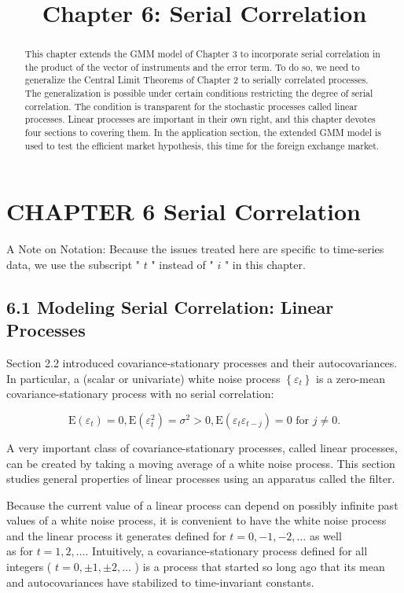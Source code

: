 \documentclass[10pt]{article}
\title{Chapter 6: Serial Correlation}
\author{}
\date{}
\begin{document}
\maketitle

\section*{CHAPTER 6 Serial Correlation}
\begin{abstract}
This chapter extends the GMM model of Chapter 3 to incorporate serial correlation in the product of the vector of instruments and the error term. To do so, we need to generalize the Central Limit Theorems of Chapter 2 to serially correlated processes. The generalization is possible under certain conditions restricting the degree of serial correlation. The condition is transparent for the stochastic processes called linear processes. Linear processes are important in their own right, and this chapter devotes four sections to covering them. In the application section, the extended GMM model is used to test the efficient market hypothesis, this time for the foreign exchange market.
\end{abstract}

A Note on Notation: Because the issues treated here are specific to time-series data, we use the subscript " $t$ " instead of " $i$ " in this chapter.

\subsection*{6.1 Modeling Serial Correlation: Linear Processes}
Section 2.2 introduced covariance-stationary processes and their autocovariances. In particular, a (scalar or univariate) white noise process $\left\{\varepsilon_{t}\right\}$ is a zero-mean covariance-stationary process with no serial correlation:

$$
\mathrm{E}\left(\varepsilon_{t}\right)=0, \mathrm{E}\left(\varepsilon_{t}^{2}\right)=\sigma^{2}>0, \mathrm{E}\left(\varepsilon_{t} \varepsilon_{t-j}\right)=0 \text { for } j \neq 0 .
$$

A very important class of covariance-stationary processes, called linear processes, can be created by taking a moving average of a white noise process. This section studies general properties of linear processes using an apparatus called the filter.

Because the current value of a linear process can depend on possibly infinite past values of a white noise process, it is convenient to have the white noise process and the linear process it generates defined for $t=0,-1,-2, \ldots$ as well\\
as for $t=1,2, \ldots$. Intuitively, a covariance-stationary process defined for all integers ( $t=0, \pm 1, \pm 2, \ldots$ ) is a process that started so long ago that its mean and autocovariances have stabilized to time-invariant constants.
\end{document}
